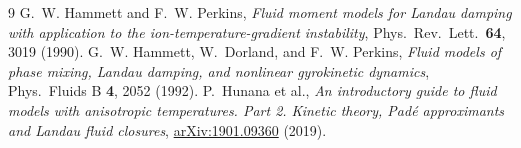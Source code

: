 \documentclass[11pt]{article}
\begin{document}
\begin{thebibliography}{9}
G.~W. Hammett and F.~W. Perkins,
\emph{Fluid moment models for Landau damping with application to the
ion-temperature-gradient instability},
Phys.\ Rev.\ Lett.\ \textbf{64}, 3019 (1990).
G.~W. Hammett, W.~Dorland, and F.~W. Perkins,
\emph{Fluid models of phase mixing, Landau damping, and nonlinear
gyrokinetic dynamics},
Phys.\ Fluids B \textbf{4}, 2052 (1992).
P.~Hunana et al.,
\emph{An introductory guide to fluid models with anisotropic temperatures.
Part 2. Kinetic theory, Pad\'e approximants and Landau fluid closures},
\href{https://arxiv.org/abs/1901.09360}{arXiv:1901.09360} (2019).
\end{thebibliography}
\end{document}
